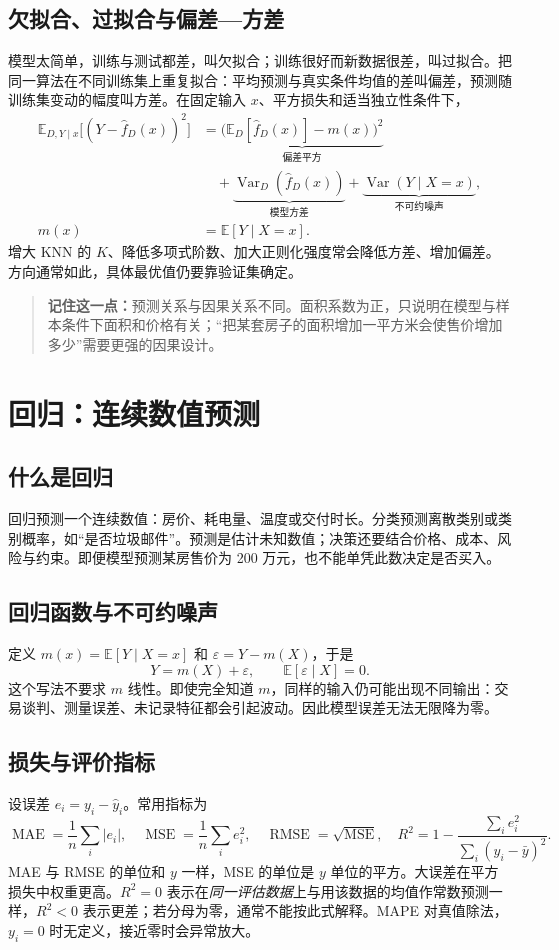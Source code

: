 \documentclass[UTF8,11pt,oneside]{ctexbook}
\newcommand{\E}{\mathbb{E}}
\newcommand{\Var}{\operatorname{Var}}
\newcommand{\MSE}{\operatorname{MSE}}
\newcommand{\RMSE}{\operatorname{RMSE}}
\newcommand{\MAE}{\operatorname{MAE}}
\newenvironment{remember}{\begin{quote}\color{teal}\textbf{记住这一点：}}{\end{quote}}
\begin{document}
\section{欠拟合、过拟合与偏差—方差}
模型太简单，训练与测试都差，叫欠拟合；训练很好而新数据很差，叫过拟合。把同一算法在不同训练集上重复拟合：平均预测与真实条件均值的差叫偏差，预测随训练集变动的幅度叫方差。在固定输入 $x$、平方损失和适当独立性条件下，
\[
\begin{aligned}
\E_{D,Y\mid x}\bigl[(Y-\hat f_D(x))^2\bigr]
&=\underbrace{\bigl(\E_D[\hat f_D(x)]-m(x)\bigr)^2}_{\text{偏差平方}}\\
&\quad+\underbrace{\Var_D(\hat f_D(x))}_{\text{模型方差}}
+\underbrace{\Var(Y\mid X=x)}_{\text{不可约噪声}},\\
m(x)&=\E[Y\mid X=x].
\end{aligned}
\]
增大 KNN 的 $K$、降低多项式阶数、加大正则化强度常会降低方差、增加偏差。方向通常如此，具体最优值仍要靠验证集确定。

\begin{remember}预测关系与因果关系不同。面积系数为正，只说明在模型与样本条件下面积和价格有关；“把某套房子的面积增加一平方米会使售价增加多少”需要更强的因果设计。\end{remember}

\chapter{回归：连续数值预测}
\section{什么是回归}
回归预测一个连续数值：房价、耗电量、温度或交付时长。分类预测离散类别或类别概率，如“是否垃圾邮件”。预测是估计未知数值；决策还要结合价格、成本、风险与约束。即便模型预测某房售价为 200 万元，也不能单凭此数决定是否买入。

\section{回归函数与不可约噪声}
定义 $m(x)=\E[Y\mid X=x]$ 和 $\varepsilon=Y-m(X)$，于是
\[
Y=m(X)+\varepsilon,\qquad \E[\varepsilon\mid X]=0.
\]
这个写法不要求 $m$ 线性。即使完全知道 $m$，同样的输入仍可能出现不同输出：交易谈判、测量误差、未记录特征都会引起波动。因此模型误差无法无限降为零。

\section{损失与评价指标}
设误差 $e_i=y_i-\hat y_i$。常用指标为
\[
\MAE=\frac1n\sum_i|e_i|,\quad
\MSE=\frac1n\sum_i e_i^2,\quad
\RMSE=\sqrt{\MSE},\quad
R^2=1-\frac{\sum_i e_i^2}{\sum_i(y_i-\bar y)^2}.
\]
MAE 与 RMSE 的单位和 $y$ 一样，MSE 的单位是 $y$ 单位的平方。大误差在平方损失中权重更高。$R^2=0$ 表示在\emph{同一评估数据}上与用该数据的均值作常数预测一样，$R^2<0$ 表示更差；若分母为零，通常不能按此式解释。MAPE 对真值除法，$y_i=0$ 时无定义，接近零时会异常放大。
\end{document}
